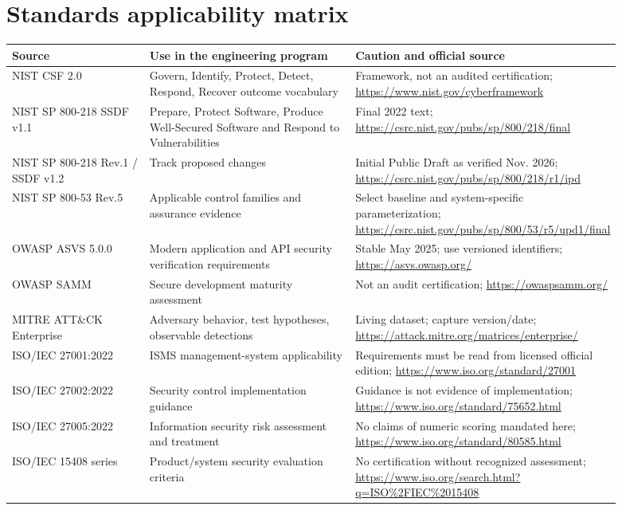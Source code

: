\documentclass[10pt,letterpaper]{article}
\begin{document}
\section{Standards applicability matrix}
\begin{longtable}{@{}p{0.24\linewidth}p{0.36\linewidth}p{0.29\linewidth}@{}}
\toprule Source & Use in the engineering program & Caution and official source\\\midrule\endhead
NIST CSF 2.0 & Govern, Identify, Protect, Detect, Respond, Recover outcome vocabulary & Framework, not an audited certification; \url{https://www.nist.gov/cyberframework}\\
NIST SP 800-218 SSDF v1.1 & Prepare, Protect Software, Produce Well-Secured Software and Respond to Vulnerabilities & Final 2022 text; \url{https://csrc.nist.gov/pubs/sp/800/218/final}\\
NIST SP 800-218 Rev.1 / SSDF v1.2 & Track proposed changes & Initial Public Draft as verified Nov. 2026; \url{https://csrc.nist.gov/pubs/sp/800/218/r1/ipd}\\
NIST SP 800-53 Rev.5 & Applicable control families and assurance evidence & Select baseline and system-specific parameterization; \url{https://csrc.nist.gov/pubs/sp/800/53/r5/upd1/final}\\
OWASP ASVS 5.0.0 & Modern application and API security verification requirements & Stable May 2025; use versioned identifiers; \url{https://asvs.owasp.org/}\\
OWASP SAMM & Secure development maturity assessment & Not an audit certification; \url{https://owaspsamm.org/}\\
MITRE ATT\&CK Enterprise & Adversary behavior, test hypotheses, observable detections & Living dataset; capture version/date; \url{https://attack.mitre.org/matrices/enterprise/}\\
ISO/IEC 27001:2022 & ISMS management-system applicability & Requirements must be read from licensed official edition; \url{https://www.iso.org/standard/27001}\\
ISO/IEC 27002:2022 & Security control implementation guidance & Guidance is not evidence of implementation; \url{https://www.iso.org/standard/75652.html}\\
ISO/IEC 27005:2022 & Information security risk assessment and treatment & No claims of numeric scoring mandated here; \url{https://www.iso.org/standard/80585.html}\\
ISO/IEC 15408 series & Product/system security evaluation criteria & No certification without recognized assessment; \url{https://www.iso.org/search.html?q=ISO%2FIEC%2015408}\\\bottomrule
\end{longtable}
\end{document}
